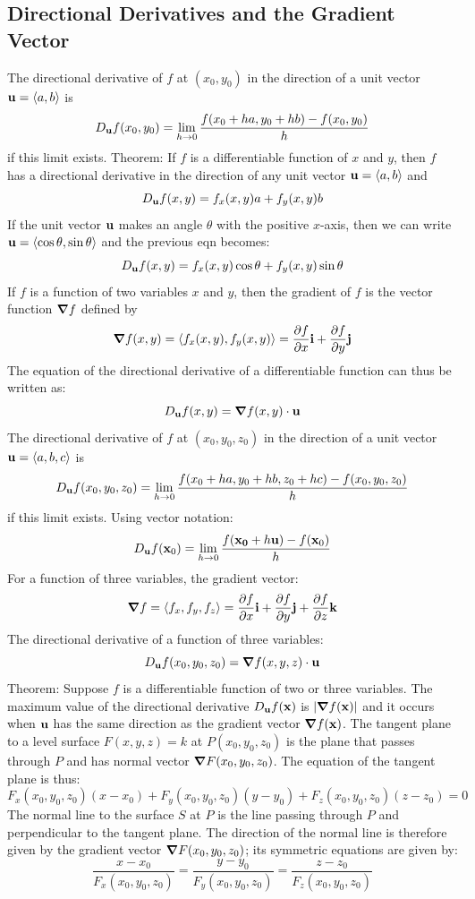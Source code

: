 \documentclass{article}
\begin{document}
    \subsection{Directional Derivatives and the Gradient Vector}
    \begin{outline}
        \1 The directional derivative of $f$ at \((x_0,y_0)\) in the direction of a unit vector \(\vb{u}=\langle a,b\rangle \) is \[D_{\vb{u}}f(x_0,y_0)=\lim_{h\to 0}\dfrac{f(x_0+ha,y_0+hb)-f(x_0,y_0)}{h}\] if this limit exists. 
        \1 Theorem: If $f$ is a differentiable function of $x$ and $y$, then $f$ has a directional derivative in the direction of any unit vector \(\vb{u}=\langle a,b\rangle\) and \[D_{\vb{u}}f(x,y)=f_x(x,y)a+f_y(x,y)b\]
            \2 If the unit vector \(\vb{u}\) makes an angle \(\theta\) with the positive $x$-axis, then we can write \(\vb{u}=\langle\cos\theta,\sin\theta\rangle\) and the previous eqn becomes: \[D_{\vb{u}}f(x,y)=f_x(x,y)\cos\theta+f_y(x,y)\sin\theta\]
        \1 If $f$ is a function of two variables $x$ and $y$, then the gradient of $f$ is the vector function \(\grad{f}\) defined by \[\grad{f(x,y)}=\langle f_x(x,y),f_y(x,y)\rangle=\pdv{f}{x}\vb{i}+\pdv{f}{y}\vb{j}\]
        \1 The equation of the directional derivative of a differentiable function can thus be written as: \[D_{\vb{u}}f(x,y)=\grad{f(x,y)}\cdot\vb{u}\]
        \1 The directional derivative of $f$ at \((x_0,y_0,z_0)\) in the direction of a unit vector \(\vb{u}=\langle a,b,c\rangle\) is \[D_{\vb{u}}f(x_0,y_0,z_0)=\lim_{h\to 0}\dfrac{f(x_0+ha,y_0+hb,z_0+hc)-f(x_0,y_0,z_0)}{h}\] if this limit exists. 
        \1 Using vector notation: \[D_{\vb{u}}f(\vb{x}_0)=\lim_{h\to 0}\dfrac{f(\vb{x_0}+h\vb{u})-f(\vb{x}_0)}{h}\]
        \1 For a function of three variables, the gradient vector: \[\grad{f}=\langle f_x,f_y,f_z\rangle=\pdv{f}{x}\vb{i}+\pdv{f}{y}\vb{j}+\pdv{f}{z}\vb{k}\]
        \1 The directional derivative of a function of three variables: \[D_{\vb{u}}f(x_0,y_0,z_0)=\grad{f(x,y,z)\cdot\vb{u}}\]
        \1 Theorem: Suppose $f$ is a differentiable function of two or three variables. The maximum value of the directional derivative \(D_{\vb{u}}f(\vb{x})\) is \(|\grad f(\vb{x})|\) and it occurs when \(\vb{u}\) has the same direction as the gradient vector \(\grad f(\vb{x})\). 
        \1 The tangent plane to a level surface \(F(x,y,z)=k\) at \(P(x_0,y_0,z_0)\) is the plane that passes through $P$ and has normal vector \(\grad F(x_0,y_0,z_0)\). The equation of the tangent plane is thus: \[F_x(x_0,y_0,z_0)(x-x_0)+F_y(x_0,y_0,z_0)(y-y_0)+F_z(x_0,y_0,z_0)(z-z_0)=0\]
        \1 The normal line to the surface $S$ at $P$ is the line passing through $P$ and perpendicular to the tangent plane. The direction of the normal line is therefore given by the gradient vector \(\grad F(x_0,y_0,z_0)\); its symmetric equations are given by: \[\dfrac{x-x_0}{F_x(x_0,y_0,z_0)}=\dfrac{y-y_0}{F_y(x_0,y_0,z_0)}=\dfrac{z-z_0}{F_z(x_0,y_0,z_0)}\]

    \end{outline}
    
\end{document}
